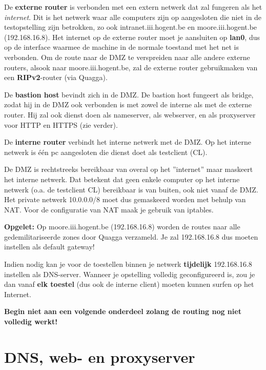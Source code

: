 \documentclass{report}
\begin{document}
De \textbf{externe router} is verbonden met een extern netwerk dat zal fungeren als het \emph{internet}.
Dit is het netwerk waar alle computers zijn op aangesloten die niet in de testopstelling zijn betrokken, zo ook intranet.iii.hogent.be en moore.iii.hogent.be (192.168.16.8).
Het internet op de externe router moet je aansluiten op \textbf{lan0}, dus op de interface waarmee de machine in de normale toestand met het net is verbonden.
Om de route naar de DMZ te verspreiden naar alle andere externe routers, alsook naar moore.iii.hogent.be, zal de externe router gebruikmaken van een \textbf{RIPv2}-router (via Quagga).

De \textbf{bastion host} bevindt zich in de DMZ.
De bastion host fungeert als bridge, zodat hij in de DMZ ook verbonden is met zowel de interne als met de externe router.
Hij zal ook dienst doen als nameserver, als webserver, en als proxyserver voor HTTP en HTTPS (zie verder).

De \textbf{interne router} verbindt het interne netwerk met de DMZ. Op het interne netwerk is één pc aangesloten die dienst doet als testclient (CL).

De DMZ is rechtstreeks bereikbaar van overal op het ''internet'' maar maskeert het interne netwerk.
Dat betekent dat geen enkele computer op het interne netwerk (o.a. de testclient CL) bereikbaar is van buiten, ook niet vanaf de DMZ.
Het private netwerk 10.0.0.0/8 moet dus gemaskeerd worden met behulp van NAT.
Voor de configuratie van NAT maak je gebruik van iptables.

\textbf{Opgelet:}
Op moore.iii.hogent.be (192.168.16.8) worden de routes naar alle gedemilitariseerde zones door Quagga verzameld.
Je zal 192.168.16.8 dus moeten instellen als default gateway!

Indien nodig kan je voor de toestellen binnen je netwerk \textbf{tijdelijk} 192.168.16.8 instellen als DNS-server.
Wanneer je opstelling volledig geconfigureerd is, zou je dan vanaf \textbf{elk toestel} (dus ook de interne client) moeten kunnen surfen op het Internet.

\textbf{Begin niet aan een volgende onderdeel zolang de routing nog niet volledig werkt!}
\section{DNS, web- en proxyserver}
\end{document}
